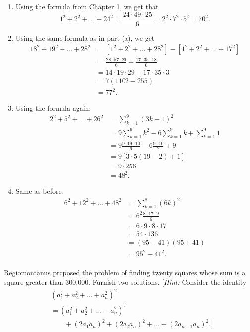 \begin{solution}
    \begin{enumerate}
        \item Using the formula from Chapter 1, we get that
        $$1^2 + 2^2 + \dots + 24^2 = \frac{24\cdot 49 \cdot 25}{6} = 2^2 \cdot 7^2 \cdot 5^2 = 70^2.$$
        \item Using the same formula as in part (a), we get
        \begin{align*}
            18^2 + 19^2 + \dots + 28^2 &= [1^2 + 2^2 + \dots + 28^2] - [1^2 + 2^2 + \dots + 17^2] \\
            &= \frac{28\cdot 57 \cdot 29}{6} - \frac{17\cdot 35 \cdot 18}{6} \\
            &= 14\cdot 19\cdot 29 - 17\cdot 35 \cdot 3 \\
            &= 7(1102 - 255) \\
            &= 77^2.
        \end{align*}
        \item Using the formula again:
        \begin{align*}
            2^2 + 5^2 + \dots + 26^2 &= \sum_{k=1}^{9}(3k-1)^2 \\
            &= 9\sum_{k=1}^{9}k^2 - 6\sum_{k=1}^{9}k + \sum_{k=1}^{9}1 \\
            &= 9\frac{9\cdot 19 \cdot 10}{6} - 6\frac{9\cdot 10}{2} + 9 \\
            &= 9[3\cdot 5(19-2) + 1] \\
            &= 9\cdot 256 \\
            &= 48^2.
        \end{align*}
        \item Same as before:
        \begin{align*}
            6^2 + 12^2 + \dots + 48^2 &= \sum_{k=1}^{8}(6k)^2 \\
            &= 6^2\frac{8\cdot 17\cdot 9}{6} \\
            &= 6\cdot 9 \cdot 8\cdot 17 \\
            &= 54\cdot 136 \\
            &= (95-41)(95+41) \\
            &= 95^2 - 41^2. \\
        \end{align*}
    \end{enumerate}
\end{solution}

\begin{exercise}
    Regiomontanus proposed the problem of finding twenty squares whose sum is a square greater than 300,000. Furnish two solutions. [\textit{Hint:} Consider the identity
    \begin{align*}
        & (a_1^2 + a_2^2 + \dots + a_n^2)^2 \\
        &= (a_1^2 + a_2^2 + \dots - a_n^2)^2 \\
        & \qquad + (2a_1a_n)^2 + (2a_2a_n)^2 + \dots + (2a_{n-1}a_n)^2.]
    \end{align*} \\
\end{exercise}

